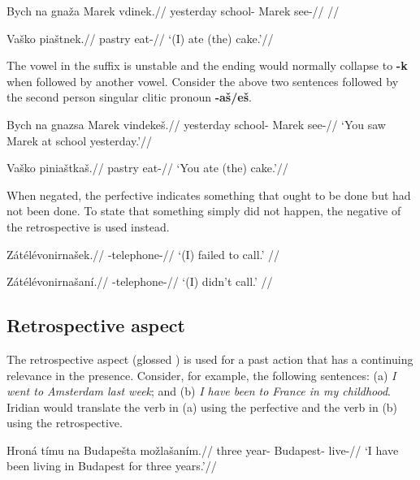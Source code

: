 \pex
\begingl
\gla Bych na gna\v{z}a Marek vdinek.//
\glb yesterday  school- Marek see-//
\glft {}//
\endgl
\xe

\pex
\begingl
\gla Va\v{s}ko pia\v{s}tnek.//
\glb pastry eat-//
\glft `(I) ate (the) cake.'//
\endgl
\xe

\par The vowel in the suffix is unstable and the ending would normally collapse to \textbf{-k} when followed by another vowel. Consider the above two sentences followed by the second person singular clitic pronoun \textbf{-a\v{s}/e\v{s}}.

\pex
\begingl
\gla Bych na gnazsa Marek vindeke\v{s}.//
\glb yesterday  school- Marek see-//
\glft `You saw Marek at school yesterday.'//
\endgl
\xe

\pex
\begingl
\gla Va\v{s}ko pinia\v{s}tka\v{s}.//
\glb pastry eat-//
\glft `You ate (the) cake.'//
\endgl
\xe


\par When negated, the perfective indicates something that ought to be done but had not been done. To state that something simply did not happen, the negative of the retrospective is used instead.

\pex
\begingl
\gla Z\'at\'el\'evonirna\v{s}ek.//
\glb {}-telephone-//
\glft `(I) failed to call.' //
\endgl
\xe

\pex
\begingl
\gla Z\'at\'el\'evonirna\v{s}an\'i.//
\glb {}-telephone-//
\glft `(I) didn't call.' //
\endgl
\xe

\subsection{Retrospective aspect}
\par The retrospective aspect (glossed ) is used for a past action that has a continuing relevance in the presence. Consider, for example, the following sentences: (a) \textit{I went to Amsterdam last week}; and (b) \textit{I have been to France in my childhood}. Iridian would translate the verb in (a) using the perfective and the verb in (b) using the retrospective.

\begingl
\gla Hroná tímu na Budape\v{s}ta mo\v{z}la\v{s}an\'im.//
\glb three year-  Budapest- live-//
\glft `I have been living in Budapest for three years.'//
\endgl
\xe

